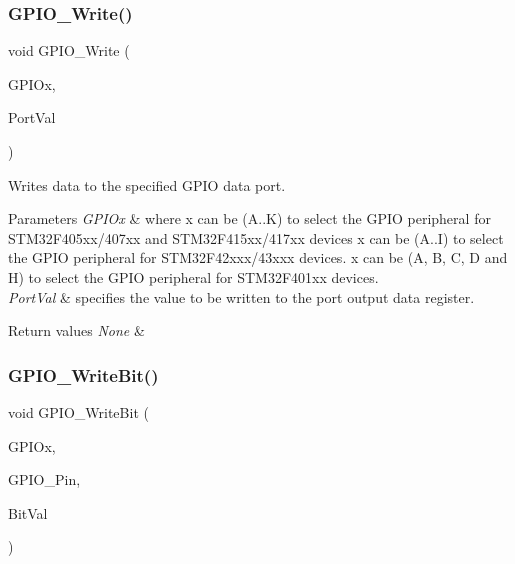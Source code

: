 \subsubsection{\texorpdfstring{G\+P\+I\+O\+\_\+\+Write()}{GPIO\_Write()}}
{\footnotesize\ttfamily void G\+P\+I\+O\+\_\+\+Write (\begin{DoxyParamCaption}\item[{G\+P\+I\+O\+\_\+\+Type\+Def $\ast$}]{G\+P\+I\+Ox,  }\item[{uint16\+\_\+t}]{Port\+Val }\end{DoxyParamCaption})}



Writes data to the specified G\+P\+IO data port. 


\begin{DoxyParams}{Parameters}
{\em G\+P\+I\+Ox} & where x can be (A..K) to select the G\+P\+IO peripheral for S\+T\+M32\+F405xx/407xx and S\+T\+M32\+F415xx/417xx devices x can be (A..I) to select the G\+P\+IO peripheral for S\+T\+M32\+F42xxx/43xxx devices. x can be (A, B, C, D and H) to select the G\+P\+IO peripheral for S\+T\+M32\+F401xx devices. \\
\hline
{\em Port\+Val} & specifies the value to be written to the port output data register. \\
\hline
\end{DoxyParams}

\begin{DoxyRetVals}{Return values}
{\em None} & \\
\hline
\end{DoxyRetVals}
\mbox{\label{group___g_p_i_o_ga8f7b237fd744d9f7456fbe0da47a9b80}} 
\subsubsection{\texorpdfstring{G\+P\+I\+O\+\_\+\+Write\+Bit()}{GPIO\_WriteBit()}}
{\footnotesize\ttfamily void G\+P\+I\+O\+\_\+\+Write\+Bit (\begin{DoxyParamCaption}\item[{G\+P\+I\+O\+\_\+\+Type\+Def $\ast$}]{G\+P\+I\+Ox,  }\item[{uint16\+\_\+t}]{G\+P\+I\+O\+\_\+\+Pin,  }\item[{\mbox{\hyperlink{group___g_p_i_o_ga176130b21c0e719121470a6042d4cf19}{Bit\+Action}}}]{Bit\+Val }\end{DoxyParamCaption})}



